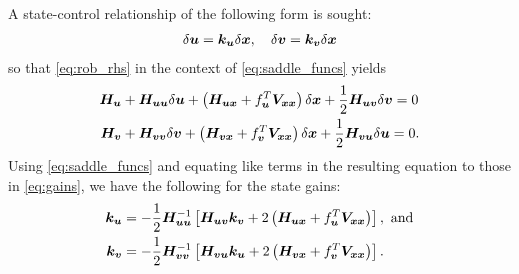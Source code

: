 A state-control relationship of the following form is sought:
%
\begin{align}
\delta \control = \gain_{\control} \delta \state, \quad \delta \disturb = \gain_{\disturb} \delta \state
\label{eq:gains}
\end{align}
%
so that \eqref{eq:rob_rhs} in the context of  \eqref{eq:saddle_funcs}  yields 
%
\begin{subequations}
	\begin{align}
		\bm{H}_{\bm{u}} &+ \bm{H}_{\bm{u}  \bm{u}} \delta \bm{u}  + \left(\bm{H}_{\bm{u}  \bm{x}} + f_{\bm{u}}^T \bm{V}_{\bm{x} \bm{x}}\right) \delta \bm{x} + \dfrac{1}{2}\bm{H}_{\bm{u}  \bm{v}} \delta \bm{v} = 0 \\
		\bm{H}_{\bm{v}} &+ \bm{H}_{\bm{v}  \bm{v}} \delta \bm{v}  + \left(\bm{H}_{\bm{v}  \bm{x}} + f_{\bm{v}}^T \bm{V}_{\bm{x} \bm{x}}\right) \delta \bm{x} + \dfrac{1}{2}\bm{H}_{\bm{v}\bm{u}} \delta \bm{u} = 0.
	\end{align}
\end{subequations}
%
Using \eqref{eq:saddle_funcs} and equating like terms in the resulting equation to  those in \eqref{eq:gains}, we have the following for the state gains:
%
\begin{align}
	\bm{k}_{\bm{u}} &= - \dfrac{1}{2}\bm{H}_{\bm{u}  \bm{u}}^{-1} \left[ \bm{H}_{\bm{u}  \bm{v}}\bm{k}_{\bm{v}}  + 2\left(\bm{H}_{\bm{u}  \bm{x}} + f_{\bm{u}}^T \bm{V}_{\bm{x} \bm{x}}\right) \right], \text{ and} \\
	\bm{k}_{\bm{v}} &= - \dfrac{1}{2}\bm{H}_{\bm{v}  \bm{v}}^{-1} \left[\bm{H}_{\bm{v}  \bm{u}} \bm{k}_{\bm{u}} +  2\left(\bm{H}_{\bm{v}  \bm{x}} + f_{\bm{v}}^T \bm{V}_{\bm{x} \bm{x}}\right)\right]. \nonumber
\end{align}        


